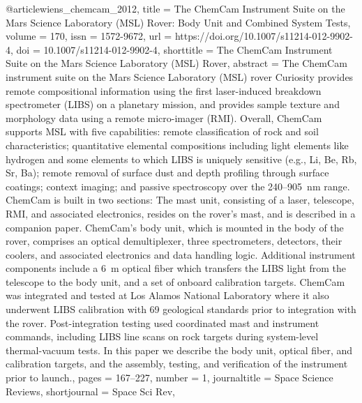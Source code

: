 @article{wiens_chemcam_2012,
	title = {The {ChemCam} Instrument Suite on the Mars Science Laboratory ({MSL}) Rover: Body Unit and Combined System Tests},
	volume = {170},
	issn = {1572-9672},
	url = {https://doi.org/10.1007/s11214-012-9902-4},
	doi = {10.1007/s11214-012-9902-4},
	shorttitle = {The {ChemCam} Instrument Suite on the Mars Science Laboratory ({MSL}) Rover},
	abstract = {The {ChemCam} instrument suite on the Mars Science Laboratory ({MSL}) rover Curiosity provides remote compositional information using the first laser-induced breakdown spectrometer ({LIBS}) on a planetary mission, and provides sample texture and morphology data using a remote micro-imager ({RMI}). Overall, {ChemCam} supports {MSL} with five capabilities: remote classification of rock and soil characteristics; quantitative elemental compositions including light elements like hydrogen and some elements to which {LIBS} is uniquely sensitive (e.g., Li, Be, Rb, Sr, Ba); remote removal of surface dust and depth profiling through surface coatings; context imaging; and passive spectroscopy over the 240–905 nm range. {ChemCam} is built in two sections: The mast unit, consisting of a laser, telescope, {RMI}, and associated electronics, resides on the rover’s mast, and is described in a companion paper. {ChemCam}’s body unit, which is mounted in the body of the rover, comprises an optical demultiplexer, three spectrometers, detectors, their coolers, and associated electronics and data handling logic. Additional instrument components include a 6 m optical fiber which transfers the {LIBS} light from the telescope to the body unit, and a set of onboard calibration targets. {ChemCam} was integrated and tested at Los Alamos National Laboratory where it also underwent {LIBS} calibration with 69 geological standards prior to integration with the rover. Post-integration testing used coordinated mast and instrument commands, including {LIBS} line scans on rock targets during system-level thermal-vacuum tests. In this paper we describe the body unit, optical fiber, and calibration targets, and the assembly, testing, and verification of the instrument prior to launch.},
	pages = {167--227},
	number = {1},
	journaltitle = {Space Science Reviews},
	shortjournal = {Space Sci Rev},
}

